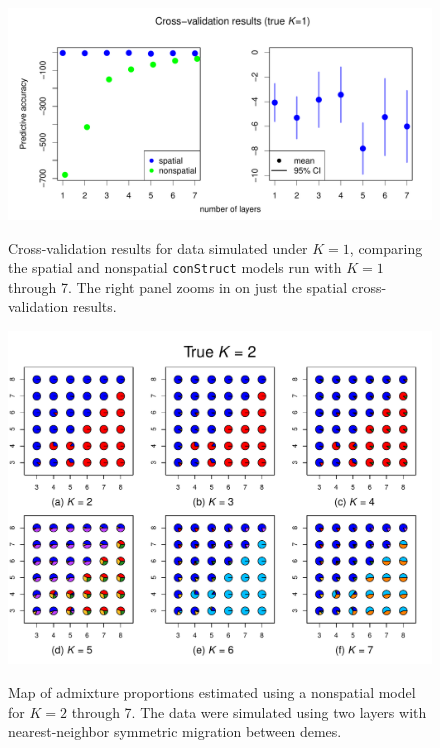 \documentclass[10pt,letterpaper]{article}
\begin{document}
\begin{figure}
	\centering
		{\includegraphics[width=\textwidth]{figs/sims/simK1_std_xval.pdf}}
		\caption{
			Cross-validation results for data simulated under $K=1$,
			comparing the spatial and nonspatial \texttt{conStruct} models run with $K=1$ through 7.  
			The right panel zooms in on just the spatial cross-validation results.
		}\label{simK1_xval}
\end{figure}
\clearpage

\begin{figure}
	\centering
		{\includegraphics[width=\textwidth]{figs/sims/simK2_nsp_pies.pdf}}
	\caption{
	Map of admixture proportions estimated using a nonspatial model for $K=2$ through 7.
	The data were simulated using two layers with nearest-neighbor symmetric migration between demes.
    }\label{simK2_nsp_pies}
\end{figure}
\clearpage
\end{document}
